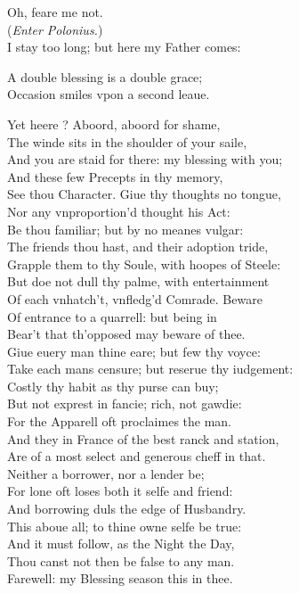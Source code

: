 \documentclass[a5paper,DIV=calc,11pt]{scrbook}
\begin{document}
\begin{drama*}
    \laerspeaks Oh, feare me not.\\
    (\textit{Enter Polonius.})\\
    I stay too long; but here my Father comes:
    
    A double blessing is a double grace;\\
    Occasion smiles vpon a second leaue.
    
    \polspeaks Yet heere \laer? Aboord, aboord for shame,\\
    The winde sits in the shoulder of your saile,\\
    And you are staid for there: my blessing with you;\\
    And these few Precepts in thy memory,\\
    See thou Character. Giue thy thoughts no tongue,\\
    Nor any vnproportion'd thought his Act:\\
    Be thou familiar; but by no meanes vulgar:\\
    The friends thou hast, and their adoption tride,\\
    Grapple them to thy Soule, with hoopes of Steele:\\
    But doe not dull thy palme, with entertainment\\
    Of each vnhatch't, vnfledg'd Comrade. Beware\\
    Of entrance to a quarrell: but being in\\
    Bear't that th'opposed may beware of thee.\\
    Giue euery man thine eare; but few thy voyce:\\
    Take each mans censure; but reserue thy iudgement:\\
    Costly thy habit as thy purse can buy;\\
    But not exprest in fancie; rich, not gawdie:\\
    For the Apparell oft proclaimes the man.\\
    And they in France of the best ranck and station,\\
    Are of a most select and generous cheff in that.\\
    Neither a borrower, nor a lender be;\\
    For lone oft loses both it selfe and friend:\\
    And borrowing duls the edge of Husbandry.\\
    This aboue all; to thine owne selfe be true:\\
    And it must follow, as the Night the Day,\\
    Thou canst not then be false to any man.\\
    Farewell: my Blessing season this in thee.
    

\end{drama*}
\end{document}
